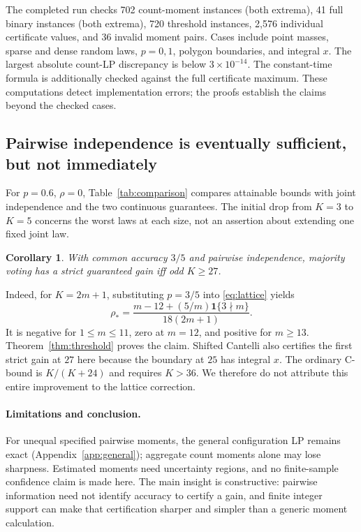 \documentclass{article}
\newtheorem{corollary}{Corollary}
\newcommand{\ind}{\mathbf 1}
\begin{document}
The completed run checks 702 count-moment instances (both extrema), 41 full binary instances (both extrema), 720 threshold instances, 2,576 individual certificate values, and 36 invalid moment pairs. Cases include point masses, sparse and dense random laws, $p=0,1$, polygon boundaries, and integral $x$. The largest absolute count-LP discrepancy is below $3\times10^{-14}$. The constant-time formula is additionally checked against the full certificate maximum. These computations detect implementation errors; the proofs establish the claims beyond the checked cases.

\subsection{Pairwise independence is eventually sufficient, but not immediately}
For $p=0.6$, $\rho=0$, Table~\ref{tab:comparison} compares attainable bounds with joint independence and the two continuous guarantees. The initial drop from $K=3$ to $K=5$ concerns the worst laws at each size, not an assertion about extending one fixed joint law.
\begin{table}[h]
\centering
\caption{Population accuracy at $p=0.6$, $\rho=0$; all numbers follow from formulas.}\label{tab:comparison}

\end{table}
\begin{corollary}
With common accuracy $3/5$ and pairwise independence, majority voting has a strict guaranteed gain iff odd $K\ge27$.
\end{corollary}
Indeed, for $K=2m+1$, substituting $p=3/5$ into \eqref{eq:lattice} yields
\begin{equation}
 \rho_*=\frac{m-12+(5/m)\ind\{3\nmid m\}}{18(2m+1)}.
\end{equation}
It is negative for $1\le m\le11$, zero at $m=12$, and positive for $m\ge13$. Theorem~\ref{thm:threshold} proves the claim. Shifted Cantelli also certifies the first strict gain at $27$ here because the boundary at $25$ has integral $x$. The ordinary C-bound is $K/(K+24)$ and requires $K>36$. We therefore do not attribute this entire improvement to the lattice correction.

\paragraph{Limitations and conclusion.}
For unequal specified pairwise moments, the general configuration LP remains exact (Appendix~\ref{app:general}); aggregate count moments alone may lose sharpness. Estimated moments need uncertainty regions, and no finite-sample confidence claim is made here. The main insight is constructive: pairwise information need not identify accuracy to certify a gain, and finite integer support can make that certification sharper and simpler than a generic moment calculation.
\end{document}
